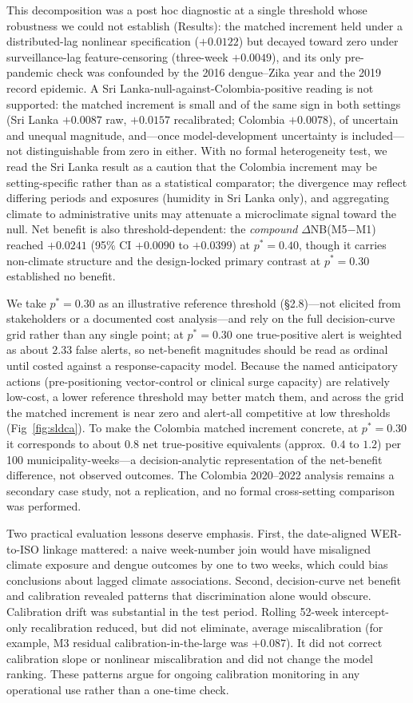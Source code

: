 \documentclass[11pt,a4paper]{article}
\begin{document}
This decomposition was a post hoc diagnostic at a single threshold whose robustness we could not establish (Results): the matched increment held under a distributed-lag nonlinear specification ($+0.0122$) but decayed toward zero under surveillance-lag feature-censoring (three-week $+0.0049$), and its only pre-pandemic check was confounded by the 2016 dengue--Zika year and the 2019 record epidemic. A Sri Lanka-null-against-Colombia-positive reading is not supported: the matched increment is small and of the same sign in both settings (Sri Lanka $+0.0087$ raw, $+0.0157$ recalibrated; Colombia $+0.0078$), of uncertain and unequal magnitude, and---once model-development uncertainty is included---not distinguishable from zero in either. With no formal heterogeneity test, we read the Sri Lanka result as a caution that the Colombia increment may be setting-specific rather than as a statistical comparator; the divergence may reflect differing periods and exposures (humidity in Sri Lanka only), and aggregating climate to administrative units may attenuate a microclimate signal toward the null. Net benefit is also threshold-dependent: the \emph{compound} $\Delta$NB(M5$-$M1) reached $+0.0241$ (95\% CI $+0.0090$ to $+0.0399$) at $p^*=0.40$, though it carries non-climate structure and the design-locked primary contrast at $p^*=0.30$ established no benefit.

We take $p^*=0.30$ as an illustrative reference threshold (\S2.8)---not elicited from stakeholders or a documented cost analysis---and rely on the full decision-curve grid rather than any single point; at $p^*=0.30$ one true-positive alert is weighted as about $2.33$ false alerts, so net-benefit magnitudes should be read as ordinal until costed against a response-capacity model. Because the named anticipatory actions (pre-positioning vector-control or clinical surge capacity) are relatively low-cost, a lower reference threshold may better match them, and across the grid the matched increment is near zero and alert-all competitive at low thresholds (Fig~\ref{fig:sldca}). To make the Colombia matched increment concrete, at $p^*=0.30$ it corresponds to about $0.8$ net true-positive equivalents (approx.\ $0.4$ to $1.2$) per 100 municipality-weeks---a decision-analytic representation of the net-benefit difference, not observed outcomes. The Colombia 2020--2022 analysis remains a secondary case study, not a replication, and no formal cross-setting comparison was performed.

Two practical evaluation lessons deserve emphasis. First, the date-aligned WER-to-ISO linkage mattered: a naive week-number join would have misaligned climate exposure and dengue outcomes by one to two weeks, which could bias conclusions about lagged climate associations. Second, decision-curve net benefit and calibration revealed patterns that discrimination alone would obscure. Calibration drift was substantial in the test period. Rolling 52-week intercept-only recalibration reduced, but did not eliminate, average miscalibration (for example, M3 residual calibration-in-the-large was $+0.087$). It did not correct calibration slope or nonlinear miscalibration and did not change the model ranking. These patterns argue for ongoing calibration monitoring in any operational use rather than a one-time check.
\end{document}
